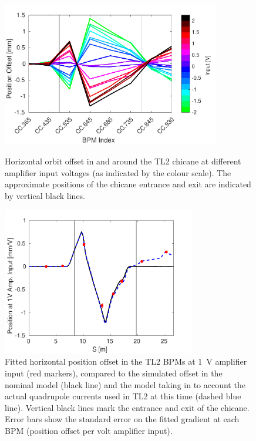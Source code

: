 \begin{figure}
  \centering
  \includegraphics[width=0.85\textwidth]{Figures/commissioning/HOrbitVsInput}
  \caption{Horizontal orbit offset in and around the TL2 chicane at different amplifier input voltages (as indicated by the colour scale). The approximate positions of the chicane entrance and exit are indicated by vertical black lines.}
  \label{f:HOrbitVsInput}
    \includegraphics[width=0.75\textwidth]{Figures/commissioning/orbClosureVsQuadModel}
  \caption{Fitted horizontal position offset in the TL2 BPMs at 1~V amplifier input (red markers), compared to the simulated offset in the nominal model (black line) and the model taking in to account the actual quadrupole currents used in TL2 at this time (dashed blue line). Vertical black lines mark the entrance and exit
   of the chicane. Error bars show the standard error on the fitted gradient at each BPM (position offset per volt amplifier input).}
  \label{f:orbClosureVsQuadModel}
\end{figure}

